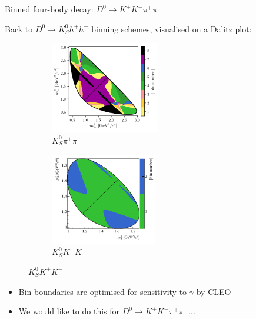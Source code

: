 \documentclass[dvipsnames]{beamer}
\begin{document}
\begin{frame}{Binned four-body decay: $D^0\to K^+K^-\pi^+\pi^-$}
  \begin{center}
    {\large Back to $D^0\to K_S^0h^+h^-$ binning schemes, visualised on a Dalitz plot:}
  \end{center}
  \vspace{-0.3cm}
  \begin{figure}
    \begin{subfigure}{0.45\textwidth}
      \includegraphics[height = 4cm]{Plots/KsPiPi_optimal.png}
      \vspace{-0.3cm}
      \caption*{$K_S^0\pi^+\pi^-$}
    \end{subfigure}%
    \begin{subfigure}{0.45\textwidth}
      \includegraphics[height = 4cm]{Plots/KsKK_binning.png}
      \vspace{-0.3cm}
      \caption*{$K_S^0K^+K^-$}
    \end{subfigure}
  \end{figure}
  \begin{itemize}
    \setlength\itemsep{0.5em}
    \item{Bin boundaries are optimised for sensitivity to $\gamma$ by CLEO}
    \item{We would like to do this for $D^0\to K^+K^-\pi^+\pi^-$...}
  \end{itemize}
\end{frame}
\end{document}

